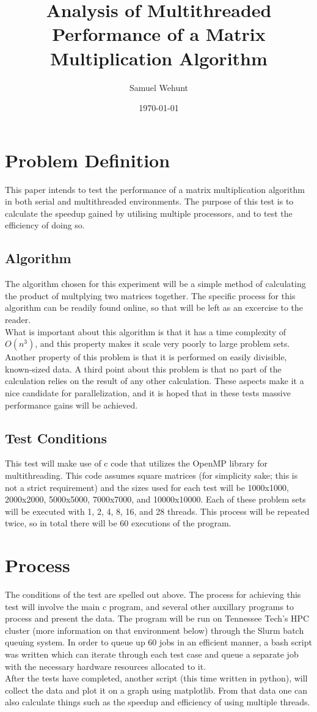 \documentclass{article}
\title{Analysis of Multithreaded Performance of a Matrix Multiplication Algorithm}
\author{Samuel Wehunt}
\date{\today}
\begin{document}
\maketitle

\section{Problem Definition}
This paper intends to test the performance of a matrix multiplication algorithm
in both serial and multithreaded environments. The purpose of this test is to
calculate the speedup gained by utilising multiple processors, and to test the
efficiency of doing so.
\subsection{Algorithm}
The algorithm chosen for this experiment will be a simple method of calculating
the product of multplying two matrices together. The specific process for this
algorithm can be readily found online, so that will be left as an excercise to
the reader.\\
What is important about this algorithm is that it has a time complexity of $O(n^3)$,
and this property makes it scale very poorly to large problem sets. Another property
of this problem is that it is performed on easily divisible, known-sized data. A third
point about this problem is that no part of the calculation relies on the result of
any other calculation. These aspects make it a nice candidate for parallelization, and
it is hoped that in these tests massive performance gains will be achieved.
\subsection{Test Conditions}
This test will make use of c code that utilizes the OpenMP library for multithreading.
This code assumes square matrices (for simplicity sake; this is not a strict requirement)
and the sizes used for each test will be 1000x1000, 2000x2000, 5000x5000, 7000x7000, and
10000x10000. Each of these problem sets will be executed with 1, 2, 4, 8, 16, and 28 threads.
This process will be repeated twice, so in total there will be 60 executions of the program.
\section{Process}
The conditions of the test are spelled out above. The process for achieving this test will
involve the main c program, and several other auxillary programs to process and present the data.
The program will be run on Tennessee Tech's HPC cluster (more information on that environment below)
through the Slurm batch queuing system. In order to queue up 60 jobs in an efficient manner, a bash
script was written which can iterate through each test case and queue a separate job with the 
necessary hardware resources allocated to it.\\
After the tests have completed, another script (this time written in python), will collect the 
data and plot it on a graph using matplotlib. From that data one can also calculate things such as
the speedup and efficiency of using multiple threads.
\end{document}
